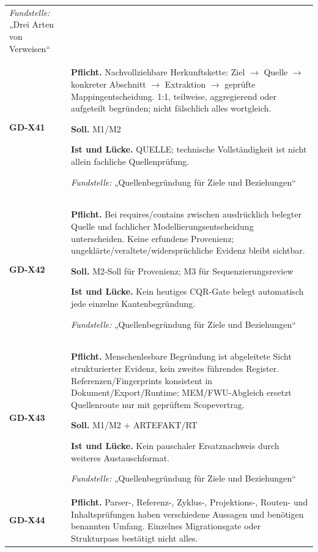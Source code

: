 \begin{longtable}{@{}P{20mm}P{128mm}@{}}
\emph{Fundstelle:} „Drei Arten von Verweisen“\\\addlinespace[5pt]
\label{rule:GD-X41}\textbf{GD-X41} &
\textbf{Pflicht.} Nachvollziehbare Herkunftskette: Ziel \ensuremath{\to} Quelle \ensuremath{\to} konkreter Abschnitt \ensuremath{\to} Extraktion \ensuremath{\to} geprüfte Mappingentscheidung. 1:1, teilweise, aggregierend oder aufgeteilt begründen; nicht fälschlich alles wortgleich.\par\smallskip
\textbf{Soll.} M1/M2\par\smallskip
\textbf{Ist und Lücke.} QUELLE; technische Vollständigkeit ist nicht allein fachliche Quellenprüfung.\par\smallskip
\emph{Fundstelle:} „Quellenbegründung für Ziele und Beziehungen“\\\addlinespace[5pt]
\label{rule:GD-X42}\textbf{GD-X42} &
\textbf{Pflicht.} Bei requires/contains zwischen ausdrücklich belegter Quelle und fachlicher Modellierungsentscheidung unterscheiden. Keine erfundene Provenienz; ungeklärte/veraltete/widersprüchliche Evidenz bleibt sichtbar.\par\smallskip
\textbf{Soll.} M2-Soll für Provenienz; M3 für Sequenzierungsreview\par\smallskip
\textbf{Ist und Lücke.} Kein heutiges CQR-Gate belegt automatisch jede einzelne Kantenbegründung.\par\smallskip
\emph{Fundstelle:} „Quellenbegründung für Ziele und Beziehungen“\\\addlinespace[5pt]
\label{rule:GD-X43}\textbf{GD-X43} &
\textbf{Pflicht.} Menschenlesbare Begründung ist abgeleitete Sicht strukturierter Evidenz, kein zweites führendes Register. Referenzen/Fingerprints konsistent in Dokument/Export/Runtime; MEM/FWU-Abgleich ersetzt Quellenroute nur mit geprüftem Scopevertrag.\par\smallskip
\textbf{Soll.} M1/M2 + ARTEFAKT/RT\par\smallskip
\textbf{Ist und Lücke.} Kein pauschaler Ersatznachweis durch weiteres Austauschformat.\par\smallskip
\emph{Fundstelle:} „Quellenbegründung für Ziele und Beziehungen“\\\addlinespace[5pt]
\label{rule:GD-X44}\textbf{GD-X44} &
\textbf{Pflicht.} Parser-, Referenz-, Zyklus-, Projektions-, Routen- und Inhaltsprüfungen haben verschiedene Aussagen und benötigen benannten Umfang. Einzelnes Migrationsgate oder Strukturpass bestätigt nicht alles.\par\smallskip

\end{longtable}
